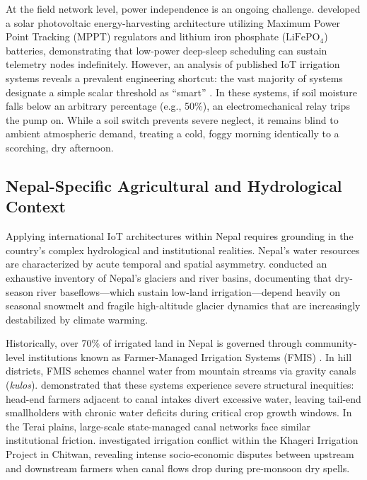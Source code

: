 \documentclass[12pt, a4paper]{article}
\begin{document}
At the field network level, power independence is an ongoing challenge. \citet{sohan2022} developed a solar photovoltaic energy-harvesting architecture utilizing Maximum Power Point Tracking (MPPT) regulators and lithium iron phosphate ($\text{LiFePO}_4$) batteries, demonstrating that low-power deep-sleep scheduling can sustain telemetry nodes indefinitely. However, an analysis of published IoT irrigation systems reveals a prevalent engineering shortcut: the vast majority of systems designate a simple scalar threshold as ``smart'' \citep{naji2021,singha2025,rajpoot2022}. In these systems, if soil moisture falls below an arbitrary percentage (e.g., 50\%), an electromechanical relay trips the pump on. While a soil switch prevents severe neglect, it remains blind to ambient atmospheric demand, treating a cold, foggy morning identically to a scorching, dry afternoon.

\subsection{Nepal-Specific Agricultural and Hydrological Context}
\label{sec:nepal}

Applying international IoT architectures within Nepal requires grounding in the country's complex hydrological and institutional realities. Nepal's water resources are characterized by acute temporal and spatial asymmetry. \citet{mool2001} conducted an exhaustive inventory of Nepal's glaciers and river basins, documenting that dry-season river baseflows—which sustain low-land irrigation—depend heavily on seasonal snowmelt and fragile high-altitude glacier dynamics that are increasingly destabilized by climate warming.

Historically, over 70\% of irrigated land in Nepal is governed through community-level institutions known as Farmer-Managed Irrigation Systems (FMIS) \citep{upadhyay2015}. In hill districts, FMIS schemes channel water from mountain streams via gravity canals (\emph{kulos}). \citet{upadhyay2015} demonstrated that these systems experience severe structural inequities: head-end farmers adjacent to canal intakes divert excessive water, leaving tail-end smallholders with chronic water deficits during critical crop growth windows. In the Terai plains, large-scale state-managed canal networks face similar institutional friction. \citet{kunwar2024} investigated irrigation conflict within the Khageri Irrigation Project in Chitwan, revealing intense socio-economic disputes between upstream and downstream farmers when canal flows drop during pre-monsoon dry spells.
\end{document}
